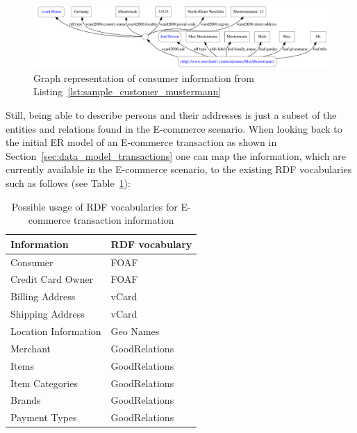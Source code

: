 
\begin{figure}[H]
	\centering
		\includegraphics[width=\columnwidth]{images/sample_customer_mustermann.pdf}
	\caption{Graph representation of consumer information from Listing~\ref{lst:sample_customer_mustermann}}
\label{fig:images_sample_customer}
\end{figure}

Still, being able to describe persons and their addresses is just a subset of the entities and relations found in the \gls{E-commerce} scenario. When looking back to the initial \gls{ER} model of an \gls{E-commerce} transaction as shown in Section~\ref{sec:data_model_transactions} one can map the information, which are currently available in the \gls{E-commerce} scenario, to the existing \gls{RDF} vocabularies such as follows (see Table~\ref{tab:map_tx_rdf_vocab}): \@

\begin{table}[H]
\centering
\begin{tabular}{p{5cm}l}
\hline
\textbf{Information} & \textbf{RDF vocabulary} \\
\hline
Consumer & FOAF \\
\hline
Credit Card Owner & FOAF \\
\hline
Billing Address & vCard \\
\hline
Shipping Address & vCard \\
\hline
Location Information & Geo Names \\
\hline
Merchant & GoodRelations \\
\hline
Items & GoodRelations \\
\hline
Item Categories & GoodRelations \\
\hline
Brands & GoodRelations \\
\hline
Payment Types & GoodRelations \\
\hline
\end{tabular}
\caption{Possible usage of \gls{RDF} vocabularies for \gls{E-commerce} transaction information}
\label{tab:map_tx_rdf_vocab}
\end{table}

